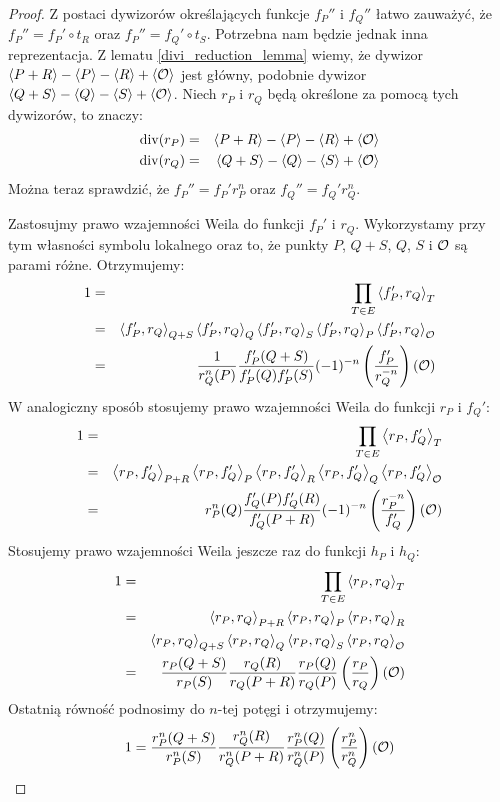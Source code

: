 \begin{proof}
Z postaci dywizorów określających funkcje $f_P''$ i $f_Q''$
łatwo zauważyć, że $f_P'' = f_P' \circ t_R$ oraz $f_P'' = f_Q' \circ t_S$.
Potrzebna nam będzie jednak inna reprezentacja.
Z lematu \ref{divi_reduction_lemma} wiemy,
że dywizor $\left\langle P+R\right\rangle - \left\langle P\right\rangle - \left\langle R\right\rangle + \left\langle\mathcal{O}\right\rangle$ jest główny,
podobnie dywizor $\left\langle Q+S\right\rangle - \left\langle Q\right\rangle - \left\langle S\right\rangle + \left\langle\mathcal{O}\right\rangle$.
Niech $r_P$ i $r_Q$ będą określone za pomocą tych dywizorów,
to znaczy:
\begin{eqnarray*}
\operatorname{div}(r_P) & = & \left\langle P+R\right\rangle - \left\langle P\right\rangle - \left\langle R\right\rangle + \left\langle\mathcal{O}\right\rangle \\
\operatorname{div}(r_Q) & = & \left\langle Q+S\right\rangle - \left\langle Q\right\rangle - \left\langle S\right\rangle + \left\langle\mathcal{O}\right\rangle
\end{eqnarray*}
Można teraz sprawdzić,
że $f_P'' = f_P'r_P^n$ oraz $f_Q'' = f_Q'r_Q^n$.

Zastosujmy prawo wzajemności Weila do funkcji $f_P'$ i $r_Q$.
Wykorzystamy przy tym własności symbolu lokalnego
oraz to, że punkty $P$, $Q+S$, $Q$, $S$ i $\mathcal{O}$ są parami różne.
Otrzymujemy:
\begin{eqnarray}
1
& = & \prod_{T \in E} \left\langle f_P' , r_Q \right\rangle_{T}
\nonumber \\
& = & \left\langle f_P' , r_Q \right\rangle_{Q+S}\left\langle f_P' , r_Q \right\rangle_{Q}      \left\langle f_P' , r_Q \right\rangle_{S}
      \left\langle f_P' , r_Q \right\rangle_{P}  \left\langle f_P' , r_Q \right\rangle_{\mathcal{O}}
\nonumber \\
\label{reciprocity_1_eqn}
& = & \frac{1}{r_Q^n(P)}\frac{f_P'(Q+S)}{f_P'(Q)f_P'(S)}
      (-1)^{-n}\left(\frac{f_P'}{r_Q^{-n}}\right)(\mathcal{O})
\end{eqnarray}
W analogiczny sposób stosujemy prawo wzajemności Weila
do funkcji $r_P$ i $f_Q'$:
\begin{eqnarray}
1
& = & \prod_{T \in E} \left\langle r_P , f_Q' \right\rangle_{T}
\nonumber \\
& = & \left\langle r_P , f_Q' \right\rangle_{P+R}\left\langle r_P , f_Q' \right\rangle_{P}       \left\langle r_P , f_Q' \right\rangle_{R}
      \left\langle r_P , f_Q' \right\rangle_{Q}  \left\langle r_P , f_Q' \right\rangle_{\mathcal{O}}
\nonumber \\
\label{reciprocity_2_eqn}
& = & r_P^n(Q)\frac{f_Q'(P)f_Q'(R)}{f_Q'(P+R)}
      (-1)^{-n}\left(\frac{r_P^{-n}}{f_Q'}\right)(\mathcal{O})
\end{eqnarray}
Stosujemy prawo wzajemności Weila jeszcze raz do funkcji $h_P$ i $h_Q$:
\begin{eqnarray}
1
& = & \prod_{T \in E} \left\langle r_P , r_Q \right\rangle_{T}
\nonumber \\
& = & \left\langle r_P , r_Q \right\rangle_{P+R}
      \left\langle r_P , r_Q \right\rangle_{P}
      \left\langle r_P , r_Q \right\rangle_{R}
\nonumber \\
&   & \left\langle r_P , r_Q \right\rangle_{Q+S}
      \left\langle r_P , r_Q \right\rangle_{Q}
      \left\langle r_P , r_Q \right\rangle_{S}
      \left\langle r_P , r_Q \right\rangle_{\mathcal{O}}
\nonumber \\
& = & \frac{r_P(Q+S)}{r_P(S)}
      \frac{r_Q(R)}{r_Q(P+R)}
      \frac{r_P(Q)}{r_Q(P)}
      \left(\frac{r_P}{r_Q}\right)(\mathcal{O})
\end{eqnarray}
Ostatnią równość podnosimy do $n$-tej potęgi i otrzymujemy:
\begin{equation}\label{reciprocity_3_eqn}
1 =
\frac{r_P^n(Q+S)}{r_P^n(S)}
\frac{r_Q^n(R)}{r_Q^n(P+R)}
\frac{r_P^n(Q)}{r_Q^n(P)}
\left(\frac{r_P^n}{r_Q^n}\right)(\mathcal{O})
\end{equation}


\end{proof}
